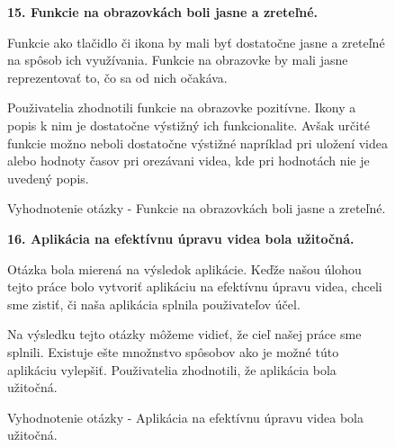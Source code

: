 \begin{figure}[H]
\textbf{15. Funkcie na obrazovkách boli jasne a zreteľné.}
 
Funkcie ako tlačidlo či ikona by mali byť dostatočne jasne a zreteľné na spôsob ich využívania. Funkcie na obrazovke by mali jasne reprezentovať to, čo sa od nich očakáva.

Použivatelia zhodnotili funkcie na obrazovke pozitívne. Ikony a popis k nim je dostatočne výstižný ich funkcionalite. Avšak určité funkcie možno neboli dostatočne výstižné napríklad pri uložení videa alebo hodnoty časov pri orezávani videa, kde pri hodnotách nie je uvedený popis.
 
\caption{Vyhodnotenie otázky - Funkcie na obrazovkách boli jasne a zreteľné.}
\end{figure}


\begin{figure}[H]
\textbf{16. Aplikácia na efektívnu úpravu videa bola užitočná.}

Otázka bola mierená na výsledok aplikácie. Keďže našou úlohou tejto práce bolo vytvoriť aplikáciu na efektívnu úpravu videa, chceli sme zistiť, či naša aplikácia splnila použivateľov účel. 

Na výsledku tejto otázky môžeme vidieť, že cieľ našej práce sme splnili. Existuje ešte množnstvo spôsobov ako je možné túto aplikáciu vylepšiť. Použivatelia zhodnotili, že aplikácia bola užitočná.

\caption{Vyhodnotenie otázky - Aplikácia na efektívnu úpravu videa bola užitočná.}
\end{figure}


